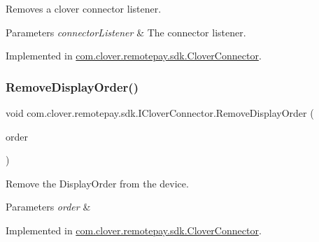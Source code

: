 Removes a clover connector listener. 


\begin{DoxyParams}{Parameters}
{\em connector\+Listener} & The connector listener.\\
\hline
\end{DoxyParams}


Implemented in \hyperlink{classcom_1_1clover_1_1remotepay_1_1sdk_1_1_clover_connector_a05aa30b8a934164519333645e267c2e5}{com.\+clover.\+remotepay.\+sdk.\+Clover\+Connector}.

\mbox{\label{interfacecom_1_1clover_1_1remotepay_1_1sdk_1_1_i_clover_connector_a55ebe329c852bedccaeb882ca71c4774}} 
\subsubsection{\texorpdfstring{Remove\+Display\+Order()}{RemoveDisplayOrder()}}
{\footnotesize\ttfamily void com.\+clover.\+remotepay.\+sdk.\+I\+Clover\+Connector.\+Remove\+Display\+Order (\begin{DoxyParamCaption}\item[{\hyperlink{classcom_1_1clover_1_1remote_1_1order_1_1_display_order}{Display\+Order}}]{order }\end{DoxyParamCaption})}



Remove the Display\+Order from the device. 


\begin{DoxyParams}{Parameters}
{\em order} & \\
\hline
\end{DoxyParams}


Implemented in \hyperlink{classcom_1_1clover_1_1remotepay_1_1sdk_1_1_clover_connector_af5a1b2bddf01b44eaa40af3f8212451b}{com.\+clover.\+remotepay.\+sdk.\+Clover\+Connector}.

\mbox{\label{interfacecom_1_1clover_1_1remotepay_1_1sdk_1_1_i_clover_connector_aafead472d6f0adc74084a229bf75e5ed}} 
